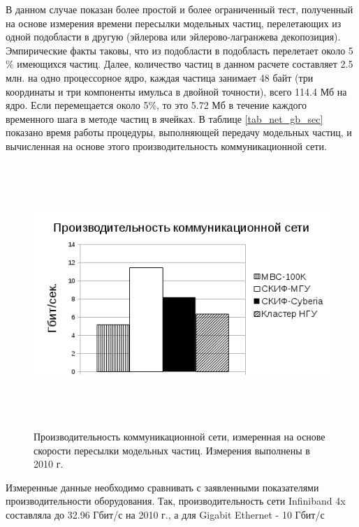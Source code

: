 В данном случае показан более простой и более ограниченный тест, полученный на основе измерения времени пересылки модельных частиц, перелетающих из одной подобласти в другую (эйлерова или эйлерово-лагранжева декопозиция). Эмпирические факты таковы, что из подобласти в подобласть перелетает около 5 \% имеющихся частиц.
Далее, количество частиц в данном расчете составляет 2.5 млн. на одно процессорное ядро, каждая частица занимает 48 байт (три координаты и три компоненты имульса в двойной точности), всего 114.4 Мб на ядро. Если перемещается около 5\%, то это 5.72 Мб в течение каждого временного шага в методе частиц в ячейках. В таблице \ref{tab_net_gb_sec} показано время работы процедуры, выполняющей передачу модельных частиц, и вычисленная на основе этого производительность коммуникационной сети.




\begin{figure}[htb]
	\begin{center}
		\includegraphics[height=10cm,keepaspectratio]{images/PIC_RAM_Gb_sec.png}
	\end{center}
	\caption{Производительность коммуникационной сети, измеренная на основе скорости пересылки модельных частиц. Измерения выполнены в 2010 г.}
	\label{plot_net_gb_sec}
\end{figure} 

Измеренные данные необходимо сравнивать с заявленными показателями производительности оборудования. Так, производительность сети Infiniband 4x составляла до 32.96 Гбит/с на 2010 г.,  а для Gigabit Ethernet - 10 Гбит/с  

